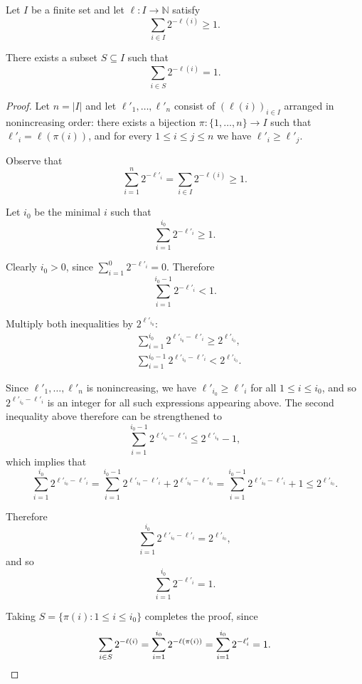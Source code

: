 \begin{lemma} \label{lem:aux}
Let $I$ be a finite set and let $\ell\colon I \to \mathbb{N}$ satisfy
\[
 \sum_{i \in I} 2^{-\ell(i)} \geq 1.
\]

There exists a subset $S \subseteq I$ such that
\[
 \sum_{i \in S} 2^{-\ell(i)} = 1.
\]
\end{lemma}
\begin{proof}
Let $n = |I|$ and let $\ell'_1,\dots,\ell'_n$ consist of $(\ell(i))_{i \in I}$ arranged in nonincreasing order: there exists a bijection $\pi\colon \{1,\dots,n\} \to I$ such that $\ell'_i = \ell(\pi(i))$, and for every $1 \leq i \leq j \leq n$ we have $\ell'_i \geq \ell'_j$.

Observe that
\[
 \sum_{i=1}^n 2^{-\ell'_i} = \sum_{i \in I} 2^{-\ell(i)} \geq 1.
\]

Let $i_0$ be the minimal $i$ such that
\[
 \sum_{i=1}^{i_0} 2^{-\ell'_i} \geq 1.
\]

Clearly $i_0 > 0$, since $\sum_{i=1}^0 2^{-\ell'_i} = 0$. Therefore
\[
 \sum_{i=1}^{i_0-1} 2^{-\ell'_i} < 1.
\]

Multiply both inequalities by $2^{\ell'_{i_0}}$:
\begin{align*}
&\sum_{i=1}^{i_0} 2^{\ell'_{i_0}-\ell'_i} \geq 2^{\ell'_{i_0}}, \\
&\sum_{i=1}^{i_0-1} 2^{\ell'_{i_0}-\ell'_i} < 2^{\ell'_{i_0}}.
\end{align*}

Since $\ell'_1,\dots,\ell'_n$ is nonincreasing, we have $\ell'_{i_0} \geq \ell'_i$ for all $1 \leq i \leq i_0$, and so $2^{\ell'_{i_0}-\ell'_i}$ is an integer for all such expressions appearing above.
The second inequality above therefore can be strengthened to
\[
 \sum_{i=1}^{i_0-1} 2^{\ell'_{i_0}-\ell'_i} \leq 2^{\ell'_{i_0}} - 1,
\]
which implies that
\[
  \sum_{i=1}^{i_0} 2^{\ell'_{i_0}-\ell'_i} = \sum_{i=1}^{i_0-1} 2^{\ell'_{i_0}-\ell'_i} + 2^{\ell'_{i_0} - \ell'_{i_0}} = \sum_{i=1}^{i_0-1} 2^{\ell'_{i_0}-\ell'_i} + 1 \leq 2^{\ell'_{i_0}}.
\]

Therefore
\[
 \sum_{i=1}^{i_0} 2^{\ell'_{i_0} - \ell'_i} = 2^{\ell'_{i_0}},
\]
and so
\[
 \sum_{i=1}^{i_0} 2^{-\ell'_i} = 1.
\]

Taking $S = \{ \pi(i) : 1 \leq i \leq i_0 \}$ completes the proof, since
\[
 \sum_{i \in S} 2^{-\ell(i)} =
 \sum_{i=1}^{i_0} 2^{-\ell(\pi(i))} =
 \sum_{i=1}^{i_0} 2^{-\ell'_i} = 1. \qedhere
\]
\end{proof}


